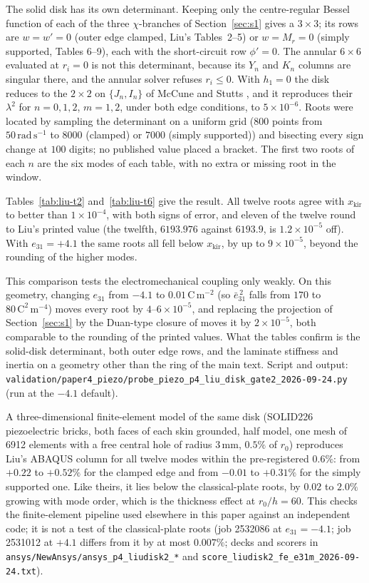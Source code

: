 \documentclass[11pt]{article}
\newcommand{\eebar}{\bar{e}_{31}}
\begin{document}
The solid disk has its own determinant. Keeping only the centre-regular
Bessel function of each of the three $\chi$-branches of
Section~\ref{sec:s1} gives a $3\times3$; its rows are $w=w'=0$ (outer
edge clamped, Liu's Tables~2--5) or $w=M_r=0$ (simply supported, Tables
6--9), each with the short-circuit row $\phi'=0$. The annular $6\times6$
evaluated at $r_i=0$ is not this determinant, because its $Y_n$ and $K_n$
columns are singular there, and the annular solver refuses $r_i\le0$.
With $h_1=0$ the disk reduces to the $2\times2$ on $\{J_n,I_n\}$ of
McCune and Stutts \cite{mccune2026ring}, and it reproduces their
$\lambda^2$ for $n=0,1,2$, $m=1,2$, under both edge conditions, to
$5\times10^{-6}$. Roots were located by sampling the determinant on a
uniform grid ($800$ points from $50\,\mathrm{rad\,s^{-1}}$ to $8000$
(clamped) or $7000$ (simply supported)) and
bisecting every sign change at $100$ digits; no published value placed a
bracket. The first two roots of each $n$ are the six modes of each table,
with no extra or missing root in the window.

Tables~\ref{tab:liu-t2} and~\ref{tab:liu-t6} give the result. All twelve
roots agree with $x_{\mathrm{kir}}$ to better than $1\times10^{-4}$, with
both signs of error, and eleven of the twelve round to Liu's printed
value (the twelfth, $6193.976$ against $6193.9$, is $1.2\times10^{-5}$
off). With $e_{31}=+4.1$ the same roots all fell below $x_{\mathrm{kir}}$,
by up to $9\times10^{-5}$, beyond the rounding of the higher modes.

This comparison tests the electromechanical coupling only weakly. On
this geometry, changing $e_{31}$ from $-4.1$ to $0.01\,\mathrm{C\,m^{-2}}$
(so $\eebar^{\,2}$ falls from $170$ to $80\,\mathrm{C^2\,m^{-4}}$) moves
every root by $4$--$6\times10^{-5}$, and replacing the projection of
Section~\ref{sec:s1} by the Duan-type closure of \cite{duan2005} moves it
by $2\times10^{-5}$, both comparable to the rounding of the printed
values. What the tables confirm is the solid-disk determinant, both
outer edge rows, and the laminate stiffness and inertia on a geometry
other than the ring of the main text. Script and output:
\texttt{validation/paper4\_piezo/probe\_piezo\_p4\_liu\_disk\_gate2\_2026-09-24.py}
(run at the $-4.1$ default).

A three-dimensional finite-element model of the same disk (SOLID226
piezoelectric bricks, both faces of each skin grounded, half model, one
mesh of 6912 elements with a free central hole of radius $3\,\mathrm{mm}$,
$0.5\%$ of $r_0$) reproduces Liu's ABAQUS column for all twelve modes
within the pre-registered $0.6\%$: from $+0.22$ to $+0.52\%$ for the
clamped edge and from $-0.01$ to $+0.31\%$ for the simply supported one.
Like theirs, it lies below the classical-plate roots, by $0.02$ to $2.0\%$
growing with mode order, which is the thickness effect at $r_0/h=60$.
This checks the finite-element pipeline used elsewhere in this paper
against an independent code; it is not a test of the classical-plate
roots (job 2532086 at $e_{31}=-4.1$; job 2531012 at $+4.1$ differs from it by
at most $0.007\%$; decks and scorers in
\texttt{ansys/NewAnsys/ansys\_p4\_liudisk2\_*} and
\texttt{score\_liudisk2\_fe\_e31m\_2026-09-24.txt}).
\end{document}
